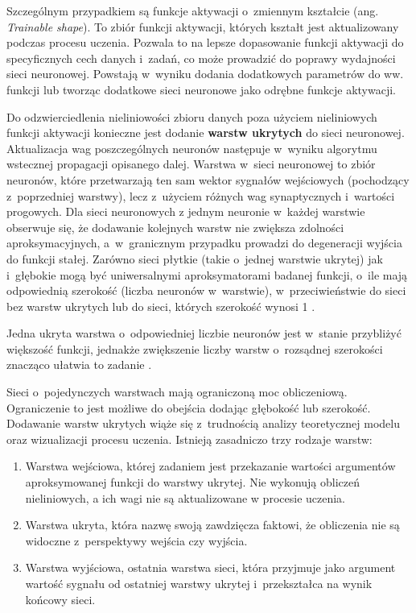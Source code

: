 Szczególnym przypadkiem są funkcje aktywacji o~zmiennym kształcie (ang. \textit{Trainable shape}). To zbiór funkcji aktywacji, których kształt jest aktualizowany podczas procesu uczenia. Pozwala to na lepsze dopasowanie funkcji aktywacji do specyficznych cech danych i~zadań, co może prowadzić do poprawy wydajności sieci neuronowej. Powstają w~wyniku dodania dodatkowych parametrów do ww. funkcji lub tworząc dodatkowe sieci neuronowe jako odrębne funkcje aktywacji.

Do odzwierciedlenia nieliniowości zbioru danych poza użyciem nieliniowych funkcji aktywacji konieczne jest dodanie \textbf{warstw ukrytych} do sieci neuronowej. Aktualizacja wag poszczególnych neuronów następuje w~wyniku algorytmu wstecznej propagacji opisanego dalej.
Warstwa w~sieci neuronowej to zbiór neuronów, które przetwarzają ten sam wektor sygnałów wejściowych (pochodzący z~poprzedniej warstwy), lecz z~użyciem różnych wag synaptycznych i~wartości progowych. 
Dla sieci neuronowych z jednym neuronie w~każdej warstwie obserwuje się, że dodawanie kolejnych warstw nie zwiększa zdolności aproksymacyjnych, a~w~granicznym przypadku prowadzi do degeneracji wyjścia do funkcji stałej.
Zarówno sieci płytkie (takie o~jednej warstwie ukrytej) jak i~głębokie mogą być uniwersalnymi aproksymatorami badanej funkcji, o~ile mają odpowiednią szerokość (liczba neuronów w~warstwie), w~przeciwieństwie do sieci bez warstw ukrytych lub do sieci, których szerokość wynosi 1 \cite{tutorial_nn_activation}.

Jedna ukryta warstwa o~odpowiedniej liczbie neuronów jest w~stanie przybliżyć większość funkcji, jednakże zwiększenie liczby warstw o~rozsądnej szerokości znacząco ułatwia to zadanie \cite{islp}.

Sieci o~pojedynczych warstwach mają ograniczoną moc obliczeniową. Ograniczenie to jest możliwe do obejścia dodając głębokość lub szerokość.
Dodawanie warstw ukrytych wiąże się z~trudnością analizy teoretycznej modelu oraz wizualizacji procesu uczenia.
Istnieją zasadniczo trzy rodzaje warstw:
\begin{enumerate}
    \item Warstwa wejściowa, której zadaniem jest przekazanie wartości argumentów aproksymowanej funkcji do warstwy ukrytej. Nie wykonują obliczeń nieliniowych, a ich wagi nie są aktualizowane w procesie uczenia.
    \item Warstwa ukryta, która nazwę swoją zawdzięcza faktowi, że obliczenia nie są widoczne z~perspektywy wejścia czy wyjścia. 
    \item Warstwa wyjściowa, ostatnia warstwa sieci, która przyjmuje jako argument wartość sygnału od ostatniej warstwy ukrytej i~przekształca na wynik końcowy sieci.
\end{enumerate}


